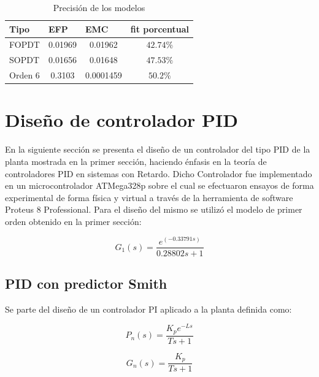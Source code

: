\documentclass[letterpaper, 10 pt, conference]{ieeeconf}  %
\begin{document}
\begin{table}[htpb]
\centering
\begin{tabular}{|l|c|c|c|}
\hline
\textbf{Tipo} & \multicolumn{1}{l|}{\textbf{EFP}}     & \multicolumn{1}{l|}{\textbf{EMC}}     & \multicolumn{1}{l|}{\textbf{fit porcentual}} \\ \hline
FOPDT   & 0.01969                     & 0.01962                      & $42.74\%$                             \\ \hline
SOPDT   & 0.01656                     & 0.01648                      & $47.53\%$                            \\ \hline
Orden 6 & 0.3103                      & 0.0001459                    & $50.2\%$                             \\ \hline
\end{tabular}
  \caption{Precisión de los modelos}
  \label{tab:precision_modelos_prbs}
\end{table}

\section{Diseño de controlador PID}
En la siguiente sección se presenta el diseño de un controlador del tipo PID de la planta mostrada en la primer sección, haciendo énfasis en la teoría de controladores PID en sistemas con Retardo. Dicho Controlador fue implementado en un microcontrolador ATMega328p sobre el cual se efectuaron ensayos de forma experimental de forma física y virtual a través de la herramienta de software Proteus 8 Professional.
Para el diseño del mismo se utilizó el modelo de primer orden obtenido en la primer sección:

\begin{equation*}
  G_1(s) = \frac{e^{(-0.33791s)}}{0.28802s+1}
\end{equation*}

\subsection{PID con predictor Smith}
Se parte del diseño de un controlador PI aplicado a la planta definida como:

\begin{equation*}
  P_n(s) = \frac{K_{p}e^{-Ls}}{Ts+1}
\end{equation*}

\begin{equation*}
  G_n(s) = \frac{K_{p}}{Ts+1}
\end{equation*}
\end{document}
